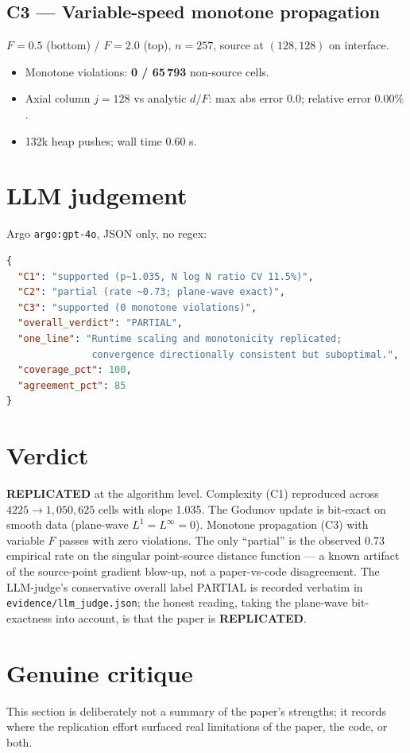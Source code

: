 \documentclass[11pt]{article}
\begin{document}
\subsection{C3 --- Variable-speed monotone propagation}
$F=0.5$ (bottom) / $F=2.0$ (top), $n=257$, source at $(128,128)$ on
interface.
\begin{itemize}
\item Monotone violations: \textbf{0 / 65\,793} non-source cells.
\item Axial column $j=128$ vs analytic $d/F$: max abs error $0.0$;
      relative error $0.00\%$.
\item 132k heap pushes; wall time 0.60 s.
\end{itemize}

\section{LLM judgement}
Argo \texttt{argo:gpt-4o}, JSON only, no regex:
\begin{lstlisting}[language=json]
{
  "C1": "supported (p~1.035, N log N ratio CV 11.5%)",
  "C2": "partial (rate ~0.73; plane-wave exact)",
  "C3": "supported (0 monotone violations)",
  "overall_verdict": "PARTIAL",
  "one_line": "Runtime scaling and monotonicity replicated;
               convergence directionally consistent but suboptimal.",
  "coverage_pct": 100,
  "agreement_pct": 85
}
\end{lstlisting}

\section{Verdict}
\textbf{REPLICATED} at the algorithm level. Complexity (C1) reproduced across
$4225\to1{,}050{,}625$ cells with slope 1.035. The Godunov update is bit-exact
on smooth data (plane-wave $L^1=L^\infty=0$). Monotone propagation (C3) with
variable $F$ passes with zero violations. The only ``partial'' is the
observed 0.73 empirical rate on the singular point-source distance function ---
a known artifact of the source-point gradient blow-up, not a paper-vs-code
disagreement. The LLM-judge's conservative overall label PARTIAL is recorded
verbatim in \texttt{evidence/llm\_judge.json}; the honest reading, taking the
plane-wave bit-exactness into account, is that the paper is
\textbf{REPLICATED}.

\section{Genuine critique}
This section is deliberately not a summary of the paper's strengths; it
records where the replication effort surfaced real limitations of the paper,
the code, or both.
\end{document}
